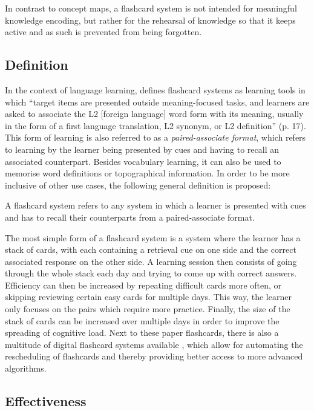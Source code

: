 In contrast to concept maps, a flashcard system is not intended for meaningful knowledge encoding, but rather for the rehearsal of knowledge so that it keeps active and as such is prevented from being forgotten.

\subsection{Definition}

In the context of language learning,  defines flashcard systems as learning tools in which ``target items are presented outside meaning-focused tasks, and learners are asked to associate the L2 [foreign language] word form with its meaning, usually in the form of a first language translation, L2 synonym, or L2 definition'' (p. 17). This form of learning is also referred to as a \emph{paired-associate format}, which refers to learning by the learner being presented by cues and having to recall an associated counterpart. Besides vocabulary learning, it can also be used to memorise word definitions or topographical information. In order to be more inclusive of other use cases, the following general definition is proposed:

\begin{definition}
    A flashcard system refers to any system in which a learner is presented with cues and has to recall their counterparts from a paired-associate format.
\end{definition}

The most simple form of a flashcard system is a system where the learner has a stack of cards, with each containing a retrieval cue on one side and the correct associated response on the other side. A learning session then consists of going through the whole stack each day and trying to come up with correct answers. Efficiency can then be increased by repeating difficult cards more often, or skipping reviewing certain easy cards for multiple days. This way, the learner only focuses on the pairs which require more practice. Finally, the size of the stack of cards can be increased over multiple days in order to improve the spreading of cognitive load. Next to these paper flashcards, there is also a multitude of digital flashcard systems available \cite{hwang2, nakata, microlearning}, which allow for automating the rescheduling of flashcards and thereby providing better access to more advanced algorithms.

\subsection{Effectiveness}

